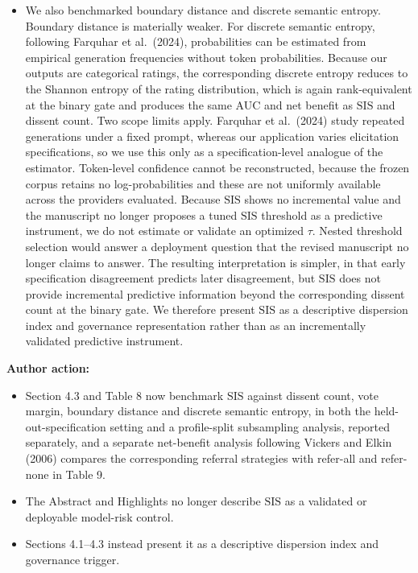 \documentclass[11pt]{article}
\begin{document}
\begin{itemize}
\item We also benchmarked boundary distance and discrete semantic entropy. Boundary distance is
materially weaker. For discrete semantic entropy, following Farquhar et al.\ (2024), probabilities
can be estimated from empirical generation frequencies without token probabilities. Because our
outputs are categorical ratings, the corresponding discrete entropy reduces to the Shannon entropy
of the rating distribution, which is again rank-equivalent at the binary gate and produces the same
AUC and net benefit as $\mathrm{SIS}$ and dissent count. Two scope limits apply. Farquhar et al.\
(2024) study repeated generations under a fixed prompt, whereas our application varies elicitation
specifications, so we use this only as a specification-level analogue of the estimator. Token-level
confidence cannot be reconstructed, because the frozen corpus retains no log-probabilities and
these are not uniformly available across the providers evaluated. Because $\mathrm{SIS}$ shows no incremental value and the manuscript no longer proposes a tuned
$\mathrm{SIS}$ threshold as a predictive instrument, we do not estimate or validate an optimized
$\tau$. Nested threshold selection would answer a deployment question that the revised manuscript
no longer claims to answer. The resulting interpretation is simpler, in that early specification
disagreement predicts later disagreement, but $\mathrm{SIS}$ does not provide incremental
predictive information beyond the corresponding dissent count at the binary gate. We therefore present $\mathrm{SIS}$ as a
descriptive dispersion index and governance representation rather than as an incrementally
validated predictive instrument.
\end{itemize}

\textbf{Author action:}

\begin{itemize}
\item Section 4.3 and Table 8 now benchmark $\mathrm{SIS}$ against dissent count, vote margin, boundary distance and discrete semantic entropy, in both the held-out-specification setting and a profile-split subsampling analysis, reported separately, and a separate net-benefit analysis following Vickers and Elkin (2006) compares the corresponding referral strategies with refer-all and refer-none in Table 9.
\item The Abstract and Highlights no longer describe $\mathrm{SIS}$ as a validated or deployable model-risk control.
\item Sections 4.1--4.3 instead present it as a descriptive dispersion index and governance trigger.
\end{itemize}
\end{document}
